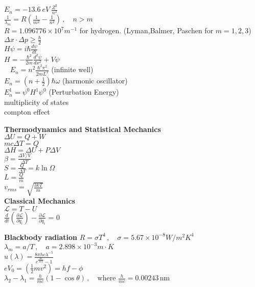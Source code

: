 \documentclass[12pt]{article}
\begin{document}
\begin{twocolumn}
\begin{flushleft}
\medskip
$\displaystyle  E_n = -13.6~eV~\frac{Z^2}{n^2}$ \\
\medskip
$\displaystyle \frac{1}{\lambda_m}=R\left( \frac{1}{m^2} - \frac{1}{n^2}\right) \, , \quad n>m $\\
$R=1.096776\times 10^7 m^{-1}$ for hydrogen. (Lyman,Balmer, Paschen for  $m=1,2,3$)
\medskip
$\displaystyle \Delta x \cdot \Delta  p \geq \frac{\hbar}{2} $ \\
\medskip
$\displaystyle H \psi=i \hbar \frac{d\psi}{dt} $ \\
\medskip
$\displaystyle H=-\frac{\hbar^2}{2m}\frac{d^2 \psi}{dx^2}+V\psi $\\\
\medskip
$\displaystyle E_n=n^2 \frac{\hbar^2 \pi^2}{2mL^2} $  (infinite well)\\ 
\medskip
$\displaystyle E_n=\left(n+\frac{1}{2} \right) \hbar \omega $ (harmonic oscillator)\\ 
\medskip
$\displaystyle E_n^1= \psi^0 H^1 \psi^0 $ (Perturbation Energy)\\
\medskip
multiplicity of states \\
\medskip
compton effect

\newpage
{\bf Thermodynamics and Statistical Mechanics} \\
\bigskip
$\displaystyle \Delta U = Q + W$\\ 
\medskip
$\displaystyle mc\Delta T = Q$\\
\medskip
$\displaystyle \Delta H = \Delta U + P\Delta V$\\
\medskip
\medskip
$\displaystyle \beta = \frac{\Delta V/V}{\Delta T}$\\
\medskip
$\displaystyle S = \frac{Q}{\Delta T} = k \ln \Omega$\\
\medskip
$\displaystyle L = \frac{Q}{m}$\\
\medskip
$\displaystyle v_{rms} = \sqrt{\frac{3 k T}{m}} $ \\
\medskip
{\bf Classical Mechanics} \\
\bigskip
$\displaystyle \mathcal{L} = T - U$ \\
\medskip
$\displaystyle \frac{d}{dt}\left(\frac{\partial \mathcal{L}}{\partial \dot{q}_{i}}\right) - \frac{\partial \mathcal{L}}{\partial q_{i}}$ = 0 \\
\bigskip

{\bf Blackbody radiation} 
$\displaystyle R=\sigma T^4 \, , \quad \sigma=5.67 \times 10^{-8} W/m^2 K^4 $ \\
\medskip
$\displaystyle \lambda_m=a/T \, , \quad a=2.898 \times 10^{-3} m\cdot K $\\
\medskip
$\displaystyle u(\lambda)=\frac{8 \pi h c \lambda^{-5}} {e^\frac{hc}{\lambda k T}-1} $\\
\medskip
$\displaystyle e V_0=\left( \frac{1}{2} m v^2\right)=hf-\phi $ \\
\medskip
$\displaystyle \lambda_2-\lambda_1=\frac{h}{mc}(1-\cos \theta)  \, , \quad \textrm{where } \frac{h}{mc}=0.00243\,  \textrm{nm} $\\
\medskip


\end{flushleft}
\end{twocolumn}
\end{document}
